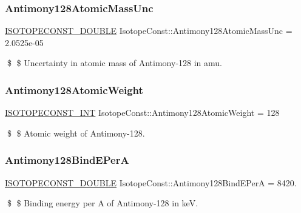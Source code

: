 \subsubsection{\texorpdfstring{Antimony128\+Atomic\+Mass\+Unc}{Antimony128AtomicMassUnc}}
{\footnotesize\ttfamily \mbox{\hyperlink{group___isotope_const-_macros_ga8f45a7272ce02c0b4c65c44636ed719a}{I\+S\+O\+T\+O\+P\+E\+C\+O\+N\+S\+T\+\_\+\+D\+O\+U\+B\+LE}} Isotope\+Const\+::\+Antimony128\+Atomic\+Mass\+Unc = 2.\+0525e-\/05}

\$ \$ Uncertainty in atomic mass of Antimony-\/128 in amu. \mbox{\label{group___isotope_const-_antimony-_sb128_ga0f36020e3ac1639253be32dc1c79e168}} 
\subsubsection{\texorpdfstring{Antimony128\+Atomic\+Weight}{Antimony128AtomicWeight}}
{\footnotesize\ttfamily \mbox{\hyperlink{group___isotope_const-_macros_ga5f18360b3e99483a35c32d789e62621c}{I\+S\+O\+T\+O\+P\+E\+C\+O\+N\+S\+T\+\_\+\+I\+NT}} Isotope\+Const\+::\+Antimony128\+Atomic\+Weight = 128}

\$ \$ Atomic weight of Antimony-\/128. \mbox{\label{group___isotope_const-_antimony-_sb128_ga7526b84c30d47e1a628a5e9fa8553797}} 
\subsubsection{\texorpdfstring{Antimony128\+Bind\+E\+PerA}{Antimony128BindEPerA}}
{\footnotesize\ttfamily \mbox{\hyperlink{group___isotope_const-_macros_ga8f45a7272ce02c0b4c65c44636ed719a}{I\+S\+O\+T\+O\+P\+E\+C\+O\+N\+S\+T\+\_\+\+D\+O\+U\+B\+LE}} Isotope\+Const\+::\+Antimony128\+Bind\+E\+PerA = 8420.}

\$ \$ Binding energy per A of Antimony-\/128 in keV. \mbox{\label{group___isotope_const-_antimony-_sb128_ga2fa151cd8be979c18662233d6a64828f}} 
